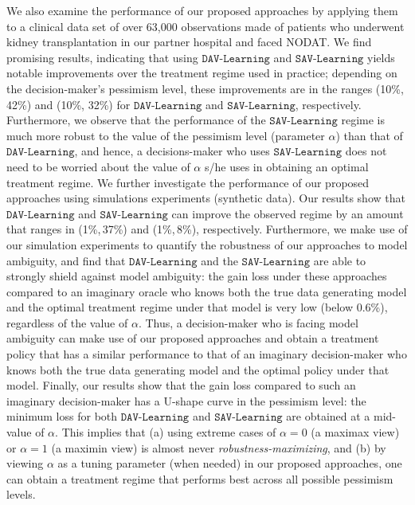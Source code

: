 \documentclass[opre,nonblindrev]{informs2}%
\newcommand{\1}{\hbox{\rm 1\kern-.35em 1}}
\newcommand{\SAV}{\texttt{SAV-Learning}}
\newcommand{\DAV}{\texttt{DAV-Learning}}
\begin{document}
We also examine the performance of our proposed approaches by applying them to a clinical data set of over 63,000 observations made of patients who underwent kidney transplantation in our partner hospital and faced NODAT.  We find promising results, indicating that using $\DAV$ and $\SAV$ yields notable improvements over the treatment regime used in practice;  depending on the decision-maker's pessimism level, these improvements are in the ranges (10\%, 42\%) and (10\%, 32\%) for $\DAV$ and $\SAV$, respectively.  Furthermore, we observe that the performance of the $\SAV$ regime is much more robust to the value of the pessimism level (parameter $\alpha$) than that of $\DAV$, and hence, a decisions-maker who uses $\SAV$ does not need to be
worried about the value of $\alpha$ s/he uses in obtaining an optimal treatment regime. We further investigate the performance of our proposed approaches using simulations experiments (synthetic data). Our results show that $\DAV$ and $\SAV$ can improve the observed regime  by an amount that ranges in (1\%,\,37\%) and (1\%,\,8\%), respectively. Furthermore, we make use of our simulation experiments to quantify the robustness of our approaches to model ambiguity, and find that $\DAV$ and the $\SAV$  are able to strongly shield against
model ambiguity: the gain loss under these approaches
compared to an imaginary oracle who knows both the true data generating model and the optimal treatment regime under that model is very low (below 0.6\%), regardless of the value of $\alpha$. Thus, a decision-maker who is facing model ambiguity can make use of our proposed
approaches and obtain a treatment policy that has a similar performance to that of an imaginary decision-maker who knows both the true data generating model and the optimal policy under that model. Finally, our results show that the gain loss compared to such an imaginary decision-maker has a U-shape curve in  the pessimism level: the minimum loss for both
$\DAV$ and  $\SAV$  are obtained at a mid-value of  $\alpha$. This implies that (a) using extreme cases of  $\alpha =0$ (a maximax view) or  $\alpha=1$ (a maximin
view) is almost never {\em robustness-maximizing}, and (b) by viewing $\alpha$ as a tuning parameter (when needed) in our proposed approaches, one can  obtain a treatment regime that performs best across all possible pessimism levels.
\end{document}
